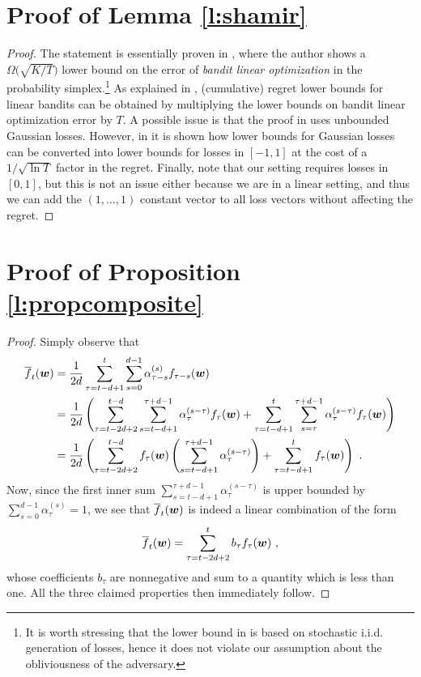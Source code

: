 \section{Proof of Lemma \ref{l:shamir}}
%
\begin{proof}
The statement is essentially proven in \citep[Theorem~5]{shamir2015complexity}, where the author shows a $\Omega\big(\sqrt{K/T}\big)$ lower bound on the error of \textsl{bandit linear optimization} in the probability simplex.\footnote
{
It is worth stressing that the lower bound in \cite{shamir2015complexity} is based on stochastic i.i.d. generation of losses, hence it does not violate our assumption about the obliviousness of the adversary.
}
As explained in \citep[Section~1.1]{shamir2015complexity}, (cumulative) regret lower bounds for linear bandits can be obtained by multiplying the lower bounds on bandit linear optimization error by $T$. A possible issue is that the proof in \citep[Theorem~5]{shamir2015complexity} uses unbounded Gaussian losses. However, in \citep[Appendix~B]{shamir2015complexity} it is shown how lower bounds for Gaussian losses can be converted into lower bounds for losses in $[-1,1]$ at the cost of a $1\big/\sqrt{\ln T}$ factor in the regret. Finally, note that our setting requires losses in $[0,1]$, but this is not an issue either because we are in a linear setting, and thus we can add the $(1,\dots,1)$ constant vector to all loss vectors without affecting the regret.
\end{proof}



\section{Proof of Proposition \ref{l:propcomposite}}
%
\begin{proof}
Simply observe that
%
\begin{align*}
{\overline{f}}_t(\boldsymbol{w})
&= \frac{1}{2d}\sum_{\tau=t-d+1}^t \sum_{s=0}^{d-1} \alpha_{\tau-s}^{(s)}f_{\tau-s}(\boldsymbol{w})\\
&= \frac{1}{2d}
    \left(
    \sum_{\tau=t-2d+2}^{t-d} \sum_{s=t-d+1}^{\tau+d-1} \alpha_{\tau}^{(s-\tau)}f_{\tau}(\boldsymbol{w})
    +
    \sum_{\tau=t-d+1}^{t} \sum_{s=\tau}^{\tau+d-1} \alpha_{\tau}^{(s-\tau)}f_{\tau}(\boldsymbol{w})
    \right)\\
&= \frac{1}{2d}
    \left(
    \sum_{\tau=t-2d+2}^{t-d} f_{\tau}(\boldsymbol{w}) \left(\sum_{s=t-d+1}^{\tau+d-1} \alpha_{\tau}^{(s-\tau)}\right)
    +
    \sum_{\tau=t-d+1}^{t} f_{\tau}(\boldsymbol{w})
    \right)~.
\end{align*}
%
Now, since the first inner sum $\sum_{s=t-d+1}^{\tau+d-1} \alpha_{\tau}^{(s-\tau)}$ is upper bounded by $\sum_{s=0}^{d-1} \alpha_{\tau}^{(s)} = 1$, we
see that ${\overline{f}}_t(\boldsymbol{w})$ is indeed a linear combination of the form
%
\[
{\overline{f}}_t(\boldsymbol{w}) = \sum_{\tau=t-2d+2}^{t} b_{\tau} f_{\tau}(\boldsymbol{w})~,
\]
%
whose coefficients $b_{\tau}$ are nonnegative and sum to a quantity which is less than one. All the three claimed properties then immediately follow.
%
\end{proof}




